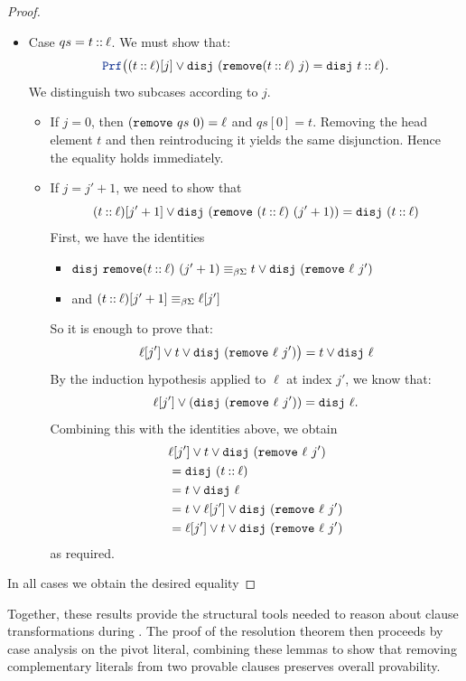 \begin{lemma}
\begin{proof}
\begin{itemize}
  \item[] Case $qs= t \mathbin{::} \ell$. We must show that:
  \[
    \prf \bigl((t \cons \ell)[j] \lor \kw{disj}~(\kw{remove}(t \cons \ell)~j) = \kw{disj}~t \cons \ell \bigr).
  \]
  We distinguish two subcases according to $j$.
  \begin{itemize}
    \item If $j=0$, then $(\texttt{\upshape{remove}}~qs~0) = \ell$ and $qs[0] = t$.
    Removing the head element $t$ and then reintroducing it yields the same disjunction.
    Hence the equality holds immediately.
    \item If $j = j' +1$, we need to show that
      \[
          (t \mathbin{::} \ell)[j'+1] \lor \texttt{\upshape{disj}}~(\texttt{\upshape{remove}}~(t \mathbin{::} \ell)~(j'+1)) = \texttt{\upshape{disj}}~(t \mathbin{::} \ell)
      \]
      First, we have the identities
      \begin{itemize}
        \item[] $\texttt{\upshape{disj}}~\texttt{\upshape{remove}}(t \mathbin{::} \ell)~(j'+1) \equiv_{\beta\Sigma} t \lor \texttt{\upshape{disj}}~(\texttt{\upshape{remove}}~\ell~j')$
        \item[] and $(t \mathbin{::} \ell)[j'+1] \equiv_{\beta\Sigma} \ell[j']$
      \end{itemize}
      So it is enough to prove that:
       \[
          \ell[j'] \lor t \lor \texttt{\upshape{disj}}~(\texttt{\upshape{remove}}~\ell~j') \bigr) = t \lor \texttt{\upshape{disj}}~\ell
      \]
      By the induction hypothesis applied to $\ell$ at index $j'$, we know that:
      \[
        \ell[j'] \lor (\texttt{\upshape{disj}}~(\texttt{\upshape{remove}}~\ell~j')) = \texttt{\upshape{disj}}~\ell.
      \]
      Combining this with the identities above, we obtain
      \begin{align*}
        &\ell[j'] \lor t \lor \texttt{\upshape{disj}}~(\texttt{\upshape{remove}}~\ell~j') \\
        &= \texttt{\upshape{disj}}~(t \mathbin{::} \ell) \\
        &= t \lor \texttt{\upshape{disj}}~\ell  \\
        &= t \lor \ell[j'] \lor \texttt{\upshape{disj}}~(\texttt{\upshape{remove}}~\ell~j') \\
        &= \ell[j'] \lor t \lor \texttt{\upshape{disj}}~(\texttt{\upshape{remove}}~\ell~j')
      \end{align*}
      as required.
  \end{itemize}
\end{itemize}
In all cases we obtain the desired equality
\end{proof}
\end{lemma}

Together, these results provide the structural tools needed to reason about clause transformations during .
The proof of the resolution theorem then proceeds by case analysis on the pivot literal, combining these lemmas to show that removing complementary literals from two provable clauses preserves overall provability.

